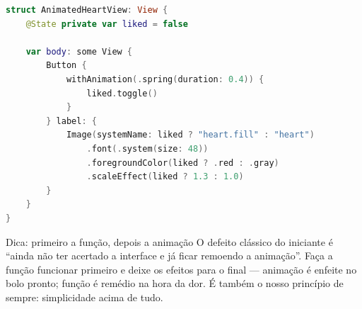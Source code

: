 \begin{lstlisting}[language=Swift]
struct AnimatedHeartView: View {
    @State private var liked = false

    var body: some View {
        Button {
            withAnimation(.spring(duration: 0.4)) {
                liked.toggle()
            }
        } label: {
            Image(systemName: liked ? "heart.fill" : "heart")
                .font(.system(size: 48))
                .foregroundColor(liked ? .red : .gray)
                .scaleEffect(liked ? 1.3 : 1.0)
        }
    }
}
\end{lstlisting}

\begin{tcbinfo}{Dica: primeiro a função, depois a animação}
O defeito clássico do iniciante é “ainda não ter acertado a interface e já ficar remoendo a animação”. Faça a função funcionar primeiro e deixe os efeitos para o final — animação é enfeite no bolo pronto; função é remédio na hora da dor. É também o nosso princípio de sempre: simplicidade acima de tudo.

\end{tcbinfo}

